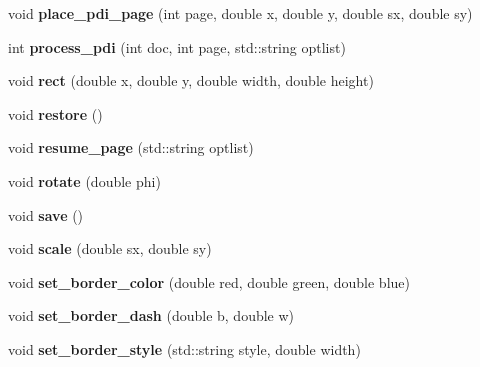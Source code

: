 \begin{DoxyCompactItemize}
\item 
\hypertarget{classPDFlib_ad56800ffc54122dfde959dbd4b922331}{}\label{classPDFlib_ad56800ffc54122dfde959dbd4b922331} 
void {\bfseries place\+\_\+pdi\+\_\+page} (int page, double x, double y, double sx, double sy)
\item 
\hypertarget{classPDFlib_a674e04d73bfe7ae771a60114445720a0}{}\label{classPDFlib_a674e04d73bfe7ae771a60114445720a0} 
int {\bfseries process\+\_\+pdi} (int doc, int page, std\+::string optlist)
\item 
\hypertarget{classPDFlib_a3c9ab4d05bd6b8716d311c05c91af04a}{}\label{classPDFlib_a3c9ab4d05bd6b8716d311c05c91af04a} 
void {\bfseries rect} (double x, double y, double width, double height)
\item 
\hypertarget{classPDFlib_a0e73e06c50b4adfe9bdf3d206b210442}{}\label{classPDFlib_a0e73e06c50b4adfe9bdf3d206b210442} 
void {\bfseries restore} ()
\item 
\hypertarget{classPDFlib_ae9ae4ec9f2162c582fbd35ff9092c497}{}\label{classPDFlib_ae9ae4ec9f2162c582fbd35ff9092c497} 
void {\bfseries resume\+\_\+page} (std\+::string optlist)
\item 
\hypertarget{classPDFlib_a083f84661e2c6ae1af089ac7f48b3897}{}\label{classPDFlib_a083f84661e2c6ae1af089ac7f48b3897} 
void {\bfseries rotate} (double phi)
\item 
\hypertarget{classPDFlib_a15c53a7de05f502273b2a9e977f0b91d}{}\label{classPDFlib_a15c53a7de05f502273b2a9e977f0b91d} 
void {\bfseries save} ()
\item 
\hypertarget{classPDFlib_a34c2b8df5a25b153402144788f5108cf}{}\label{classPDFlib_a34c2b8df5a25b153402144788f5108cf} 
void {\bfseries scale} (double sx, double sy)
\item 
\hypertarget{classPDFlib_ae32d8f048a4bcc36c4440e844685d83e}{}\label{classPDFlib_ae32d8f048a4bcc36c4440e844685d83e} 
void {\bfseries set\+\_\+border\+\_\+color} (double red, double green, double blue)
\item 
\hypertarget{classPDFlib_aaf02e71f9941ea7f615579cbd70b1d75}{}\label{classPDFlib_aaf02e71f9941ea7f615579cbd70b1d75} 
void {\bfseries set\+\_\+border\+\_\+dash} (double b, double w)
\item 
\hypertarget{classPDFlib_a0353836b9d1e47007aea5eb9573e4abf}{}\label{classPDFlib_a0353836b9d1e47007aea5eb9573e4abf} 
void {\bfseries set\+\_\+border\+\_\+style} (std\+::string style, double width)
\item 
\hypertarget{classPDFlib_a3454c94557adb7486abbad059bbe98f2}{}\label{classPDFlib_a3454c94557adb7486abbad059bbe98f2} 

\end{DoxyCompactItemize}
